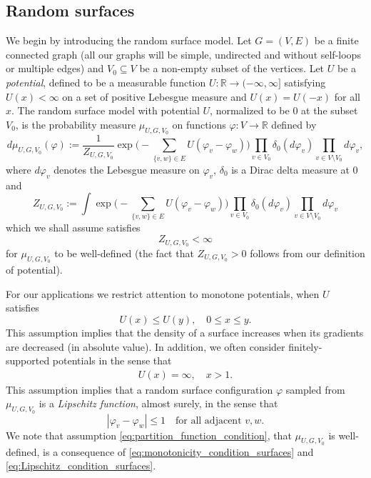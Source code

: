 \documentclass[english]{article}
\theoremstyle{plain}
\theoremstyle{plain}
\begin{document}
\subsection{Random surfaces}\label{sec:random_surfaces}
We begin by introducing the random surface model. Let $G = (V, E)$
be a finite connected graph (all our graphs will be simple,
undirected and without self-loops or multiple edges) and
$V_0\subseteq V$ be a non-empty subset of the vertices. Let $U$ be a
\emph{potential}, defined to be a measurable function
$U:\mathbb{R}\to(-\infty,\infty]$ satisfying $U(x)<\infty$ on a set
of positive Lebesgue measure and $U(x)=U(-x)$ for all $x$. The
random surface model with potential $U$, normalized to be $0$ at the
subset $V_0$, is the probability measure $\mu_{U,G,V_0}$ on
functions $\varphi:V\to\mathbb{R}$ defined by
\begin{equation}\label{eq:random_surface_measure}
  d\mu_{U, G, V_0}(\varphi) := \frac{1}{Z_{U, G, V_0}} \exp\Bigg(-\sum_{\{v,w\}\in E}
  U(\varphi_v - \varphi_w)\Bigg) \prod_{v\in V_0}\delta_0(d\varphi_v)\prod_{v\in V\setminus V_0}
  d\varphi_v,
\end{equation}
where $d\varphi_v$ denotes the Lebesgue measure on $\varphi_v$,
$\delta_0$ is a Dirac delta measure at $0$ and
\begin{equation*}
  Z_{U, G, V_0}:=\int \exp\Bigg(-\sum_{\{v,w\}\in E}
  U(\varphi_v - \varphi_w)\Bigg) \prod_{v\in V_0}\delta_0(d\varphi_v)\prod_{v\in V\setminus V_0}
  d\varphi_v
\end{equation*}
which we shall assume satisfies
\begin{equation}\label{eq:partition_function_condition}
  Z_{U, G, V_0} < \infty
\end{equation}
for $\mu_{U, G, V_0}$ to be well-defined (the fact that
$Z_{U,G,V_0}>0$ follows from our definition of potential).

For our applications we restrict attention to monotone potentials,
when $U$ satisfies
\begin{equation}\label{eq:monotonicity_condition_surfaces}
  U(x)\leq  U(y), \quad 0\leq x\leq y.
\end{equation}
This assumption implies that the density of a surface increases when
its gradients are decreased (in absolute value). In addition, we
often consider finitely-supported potentials in the sense that
\begin{align}
U(x)=\infty, \quad x>1.\label{eq:Lipschitz_condition_surfaces}
\end{align}
This assumption implies that a random surface configuration
$\varphi$ sampled from $\mu_{U,G,V_0}$ is a \emph{Lipschitz
function}, almost surely, in the sense that
\begin{equation}\label{eq:Lipschitz_function}
  |\varphi_v-\varphi_w|\le 1\quad\text{for all adjacent $v,w$.}
\end{equation}
We note that assumption \eqref{eq:partition_function_condition},
that $\mu_{U, G, V_0}$ is well-defined, is a consequence of
\eqref{eq:monotonicity_condition_surfaces} and
\eqref{eq:Lipschitz_condition_surfaces}.
\end{document}
